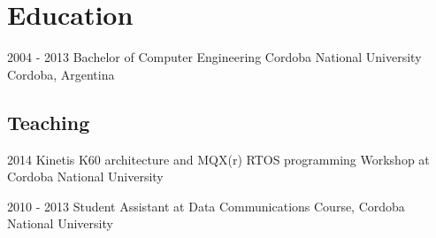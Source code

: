 
\section{Education}

  \cventry
    {2004 - 2013}
    {Bachelor of Computer Engineering}
    {Cordoba National University}
    {Cordoba, Argentina}
    {}
    {}

\subsection{Teaching}

  \cvitem
    {2014} %
    {Kinetis K60 architecture and MQX(r) RTOS programming Workshop at Cordoba National University}

  \cvitem
    {2010 - 2013}
    {Student Assistant at Data Communications Course, Cordoba National University}

